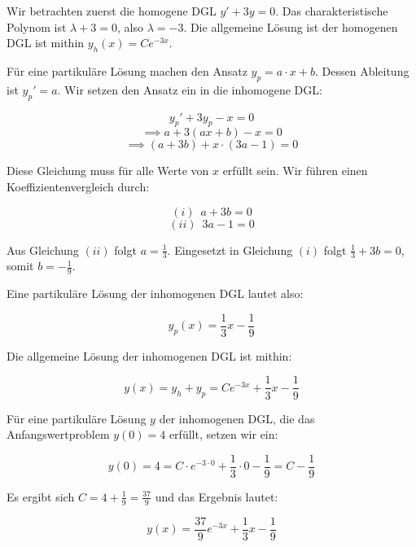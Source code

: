 \item

Wir betrachten zuerst die homogene DGL $y'+3y=0$. Das charakteristische Polynom ist $\lambda + 3 = 0$, also $\lambda = -3$. Die allgemeine Lösung ist der homogenen DGL ist mithin $y_h(x) = C e^{-3x}$.

Für eine partikuläre Lösung machen den Ansatz $y_p = a\cdot x + b$. Dessen Ableitung ist $y_p' = a$. Wir setzen den Ansatz ein in die inhomogene DGL:

$$y_p'+3y_p-x=0$$ 
$$\implies a + 3 (ax+b) -x = 0$$ 
$$\implies (a + 3b) + x \cdot (3a-1) = 0$$ 

Diese Gleichung muss für alle Werte von $x$ erfüllt sein. Wir führen einen Koeffizientenvergleich durch:

\begin{samepage}
$$(i)\enspace a+3b = 0$$
$$(ii)\enspace 3a-1 = 0$$
\end{samepage}

Aus Gleichung $(ii)$ folgt $a=\frac{1}{3}$. Eingesetzt in Gleichung $(i)$ folgt $\frac{1}{3} + 3b = 0$, somit $b=-\frac{1}{9}$.

Eine partikuläre Lösung der inhomogenen DGL lautet also:

$$y_p(x) = \frac{1}{3} x - \frac{1}{9}$$

Die allgemeine Lösung der inhomogenen DGL ist mithin:

$$y(x) = y_h + y_p = C e^{-3x} + \frac{1}{3} x - \frac{1}{9}$$

Für eine partikuläre Lösung $y$ der inhomogenen DGL, die das Anfangswertproblem $y(0) = 4$ erfüllt, setzen wir ein:

$$y(0) = 4 = C\cdot e^{-3\cdot 0} + \frac{1}{3}\cdot 0 - \frac{1}{9} = C-\frac{1}{9}$$

Es ergibt sich $C=4+\frac{1}{9}=\frac{37}{9}$ und das Ergebnis lautet:

$$y(x) = \frac{37}{9} e^{-3x} + \frac{1}{3} x - \frac{1}{9}$$

